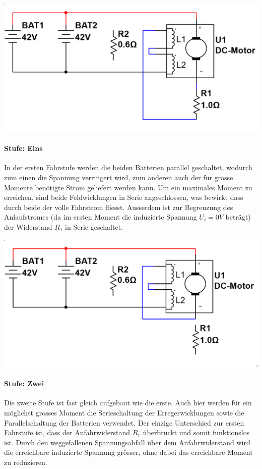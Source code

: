 \begin{minipage}{0.49\textwidth}
	\includegraphics[width=\columnwidth]{images/Stufenschalter/Stufe_1.png}%
\end{minipage}
\begin{minipage}{0.5\textwidth}
	\paragraph{Stufe: Eins}
	In der ersten Fahrstufe werden die beiden Batterien parallel geschaltet, wodurch zum einen die Spannung verringert wird, zum anderen auch der für grosse Momente benötigte Strom geliefert werden kann. Um ein maximales Moment zu erreichen, sind beide Feldwicklungen in Serie angeschlossen, was bewirkt dass durch beide der volle Fahrstrom fliesst. Ausserdem ist zur Begrenzung des Anlaufstromes (da im ersten Moment die induzierte Spannung $U_i=0V$ beträgt) der Widerstand $R_1$ in Serie geschaltet.
\end{minipage}

\begin{minipage}{0.49\textwidth}
	\includegraphics[width=\columnwidth]{images/Stufenschalter/Stufe_2.png}%
\end{minipage}
\begin{minipage}{0.5\textwidth}
	\paragraph{Stufe: Zwei}
	Die zweite Stufe ist fast gleich aufgebaut wie die erste. Auch hier werden für ein möglichst grosses Moment die Serieschaltung der Erregerwicklungen sowie die Parallelschaltung der Batterien verwendet. Der einzige Unterschied zur ersten Fahrstufe ist, dass der Anfahrwiderstand $R_1$ überbrückt und somit funktionslos ist. Durch den weggefallenen Spannungsabfall über dem Anfahrwiderstand wird die erreichbare induzierte Spannung grösser, ohne dabei das erreichbare Moment zu reduzieren.
\end{minipage}


